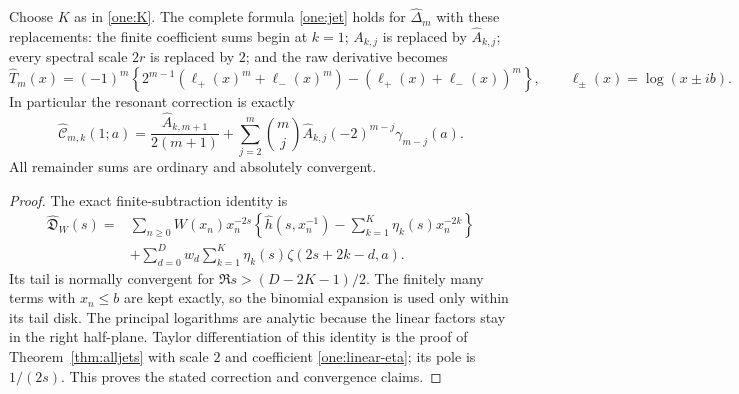 \begin{corollary}
\label{cor:linear-jets}
Choose $K$ as in \eqref{one:K}.  The complete formula
\eqref{one:jet} holds for $\widehat\Delta_m$ with these replacements:
the finite coefficient sums begin at $k=1$; $A_{k,j}$ is replaced by
$\widehat A_{k,j}$; every spectral scale $2r$ is replaced by $2$;
and the raw derivative becomes
\begin{equation}\label{one:linear-T}
 \widehat T_m(x)=(-1)^m\left\{
   2^{m-1}(\ell_+(x)^m+\ell_-(x)^m)
                    -(\ell_+(x)+\ell_-(x))^m\right\},\qquad
 \ell_\pm(x)=\log(x\pm ib).
\end{equation}
In particular the resonant correction is exactly
\begin{equation}\label{one:linear-contact}
 \widehat{\mathcal C}_{m,k}(1;a)
 =\frac{\widehat A_{k,m+1}}{2(m+1)}
    +\sum_{j=2}^m\binom mj\widehat A_{k,j}(-2)^{m-j}
                                      \gamma_{m-j}(a).
\end{equation}
All remainder sums are ordinary and absolutely convergent.
\end{corollary}
\begin{proof}
The exact finite-subtraction identity is
\begin{align*}
 \widehat{\mathfrak D}_W(s)
 ={}&\sum_{n\ge0}W(x_n)x_n^{-2s}
       \left\{\widehat h(s,x_n^{-1})-
                         \sum_{k=1}^K\eta_k(s)x_n^{-2k}\right\}\\
 &+\sum_{d=0}^D w_d\sum_{k=1}^K
                            \eta_k(s)\zeta(2s+2k-d,a).
\end{align*}
Its tail is normally convergent for $\Re s>(D-2K-1)/2$.
The finitely many terms with $x_n\le b$ are kept exactly, so the
binomial expansion is used only within its tail disk.  The principal
logarithms are analytic because the linear factors stay in the right
half-plane.  Taylor differentiation of this identity is the proof of
Theorem~\ref{thm:alljets} with scale $2$ and coefficient
\eqref{one:linear-eta}; its pole is $1/(2s)$.
This proves the stated correction and convergence claims.
\end{proof}

